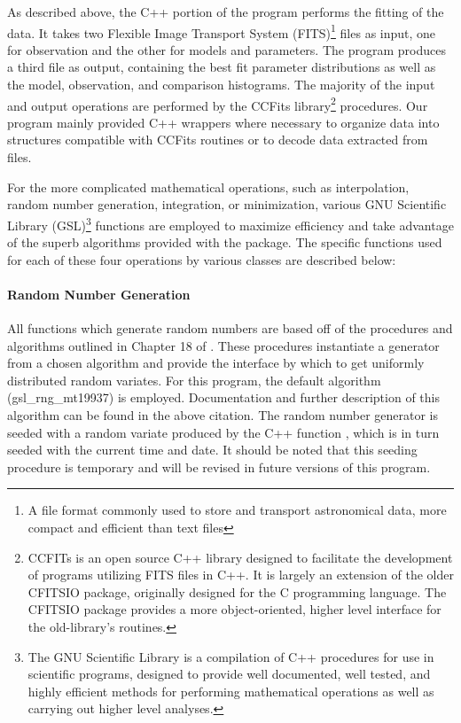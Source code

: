 \documentclass[twocolumn,letterpaper,10pt]{article}
\begin{document}
As described above, the C++ portion of the program performs the fitting of the data. It takes two Flexible Image Transport System (FITS)\footnote{A file format commonly used to store and transport astronomical data, more compact and efficient than text files} files as input, one for observation and the other for models and parameters. The program produces a third file as output, containing the best fit parameter distributions as well as the model, observation, and comparison histograms. The majority of the input and output operations are performed by the CCFits library\footnote{CCFITs \citep{CCFITS} is an open source C++ library designed to facilitate the development of programs utilizing FITS files in C++. It is largely an extension of the older CFITSIO \citep{CFITSIO} package, originally designed for the C programming language. The CFITSIO package provides a more object-oriented, higher level interface for the old-library's routines.} procedures. Our program mainly provided C++ wrappers where necessary to organize data into structures compatible with CCFits routines or to decode data extracted from files. 

For the more complicated mathematical operations, such as interpolation, random number generation, integration, or minimization, various GNU Scientific Library (GSL)\footnote{The GNU Scientific Library \citep[GSL, ][]{GSL} is a compilation of C++ procedures for use in scientific programs, designed to provide well documented, well tested, and highly efficient methods for performing mathematical operations as well as carrying out higher level analyses.} functions are employed to maximize efficiency and take advantage of the superb algorithms provided with the package. The specific functions used for each of these four operations by various classes are described below:

\paragraph{Random Number Generation}

All functions which generate random numbers are based off of the procedures and algorithms outlined in Chapter 18 of \citet{GSL}. These procedures instantiate a generator from a chosen algorithm and provide the interface by which to get uniformly distributed random variates. For this program, the default algorithm ({\sc gsl\_rng\_mt19937}) is employed. Documentation and further description of this algorithm can be found in the above citation. The random number generator is seeded with a random variate produced by the C++ function {}, which is in turn seeded with the current time and date. It should be noted that this seeding procedure is temporary and will be revised in future versions of this program. 
\end{document}
